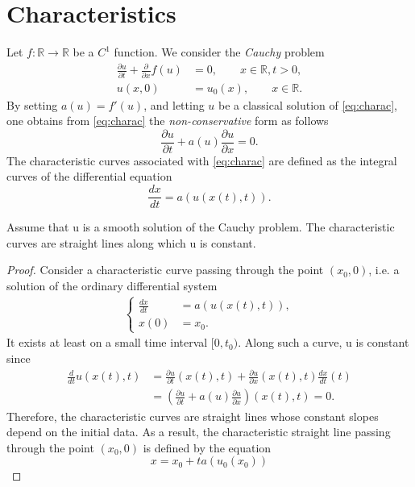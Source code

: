 \documentclass[12pt]{article}
\begin{document}
\section{Characteristics}
Let $f:\mathbb{R}\rightarrow\mathbb{R}$ be a $C^1$ function. We consider the \emph{Cauchy} problem
\begin{align}\label{eq:charac}
	\frac{\partial u}{\partial t} + \frac{\partial}{\partial x}f(u) & = 0,        \qquad  x\in\mathbb{R}, t>0, \\
	u(x,0)                                                          & = u_{0}(x), \qquad  x\in\mathbb{R}.
\end{align}
By setting $a(u) = f'(u)$, and letting $u$ be a classical solution of \eqref{eq:charac},
one obtains from \eqref{eq:charac} the \emph{non-conservative} form as follows
\begin{equation}
	\frac{\partial u}{\partial t} + a(u)\frac{\partial u}{\partial x} = 0.
\end{equation}
The characteristic curves associated with \eqref{eq:charac} are defined as the integral curves
of the differential equation
\begin{equation}
	\frac{dx}{dt} = a(u(x(t),t)).
\end{equation}
\begin{proposition}
	Assume that u is a smooth solution of the Cauchy problem. The characteristic curves 
	are straight lines along which u is constant.
\end{proposition}
\begin{proof}
	Consider a characteristic curve passing through the point $(x_{0},0)$, i.e.
	a solution of the ordinary differential system
	\begin{align}
		\begin{cases}\displaystyle
			\frac{dx}{dt} & = a(u(x(t),t)), \\
			x(0)          & = x_{0}.
		\end{cases}
	\end{align}
	It exists at least on a small time interval $[0,t_{0})$. 
	Along such a curve, u is constant since
	\begin{align*}
		\frac{d}{dt}u(x(t),t) 
		 & = \frac{\partial u}{\partial t}(x(t),t)
		+ \frac{\partial u}{\partial x}(x(t),t) \frac{dx}{dt}(t)                                    \\
		 & =\left(\frac{\partial u}{\partial t} + a(u)\frac{\partial u}{\partial x}\right)(x(t),t) 
		= 0.
	\end{align*}
	Therefore, the characteristic curves are straight lines whose constant slopes depend
	on the initial data. As a result, the characteristic straight line passing through
	the point $(x_{0},0)$ is defined by the equation
	\begin{equation}
		\boxed{
			x = x_{0} + ta(u_{0}(x_{0}))
		}
	\end{equation}
\end{proof}
\end{document}
